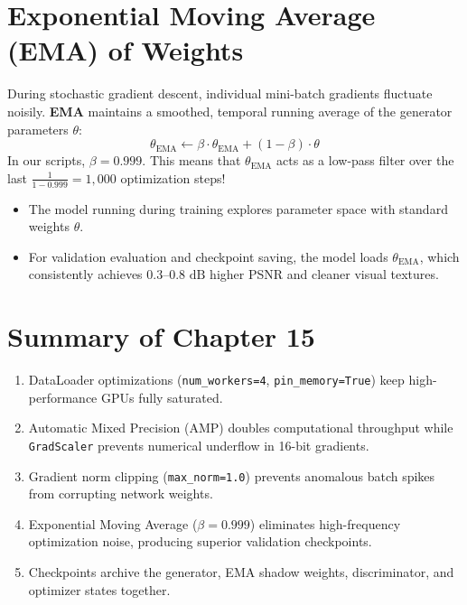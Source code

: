\section{Exponential Moving Average (EMA) of Weights}
During stochastic gradient descent, individual mini-batch gradients fluctuate noisily. \textbf{EMA} maintains a smoothed, temporal running average of the generator parameters $\theta$:
\begin{equation}
\theta_{\text{EMA}} \leftarrow \beta \cdot \theta_{\text{EMA}} + (1 - \beta) \cdot \theta
\end{equation}
In our scripts, $\beta = 0.999$. This means that $\theta_{\text{EMA}}$ acts as a low-pass filter over the last $\frac{1}{1 - 0.999} = 1{,}000$ optimization steps!
\begin{itemize}
    \item The model running during training explores parameter space with standard weights $\theta$.
    \item For validation evaluation and checkpoint saving, the model loads $\theta_{\text{EMA}}$, which consistently achieves $0.3\text{--}0.8\text{ dB}$ higher PSNR and cleaner visual textures.
\end{itemize}

\section{Summary of Chapter 15}
\begin{enumerate}
    \item DataLoader optimizations (\texttt{num\_workers=4}, \texttt{pin\_memory=True}) keep high-performance GPUs fully saturated.
    \item Automatic Mixed Precision (AMP) doubles computational throughput while \texttt{GradScaler} prevents numerical underflow in 16-bit gradients.
    \item Gradient norm clipping (\texttt{max\_norm=1.0}) prevents anomalous batch spikes from corrupting network weights.
    \item Exponential Moving Average ($\beta=0.999$) eliminates high-frequency optimization noise, producing superior validation checkpoints.
    \item Checkpoints archive the generator, EMA shadow weights, discriminator, and optimizer states together.
\end{enumerate}

